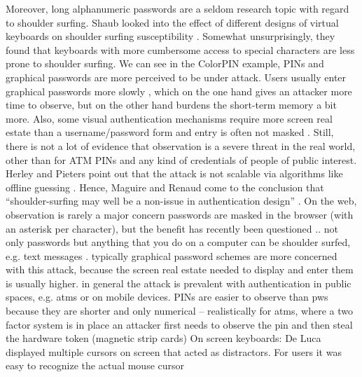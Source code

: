 Moreover, long alphanumeric passwords are a seldom research topic with regard to shoulder surfing. Shaub \etal looked into the effect of different designs of virtual keyboards on shoulder surfing susceptibility \cite{Schaub2012PasswordShoulderSurfing}. Somewhat unsurprisingly, they found that keyboards with more cumbersome access to special characters are less prone to shoulder surfing. We can see in the ColorPIN example, PINs and graphical passwords are more perceived to be under attack. Users usually enter graphical passwords more slowly \cite{Tari2006ShoulderSurfingComparison, Wiedenbeck2006ConvexHull, Renaud2009VisualSnakeOil}, which on the one hand gives an attacker more time to observe, but on the other hand burdens the short-term memory a bit more. Also, some visual authentication mechanisms require more screen real estate than a username/password form and entry is often not masked \cite{Biddle2009GraphicalFirstTwelveYears}. Still, there is not a lot of evidence that observation is a severe threat in the real world, other than for ATM PINs and any kind of credentials of people of public interest. Herley and Pieters point out that the attack is not scalable via algorithms like offline guessing \cite{Herley2015Counterfactuals}. Hence, Maguire and Renaud come to the conclusion that ``shoulder-surfing may well be a non-issue in authentication design'' \cite{Maguire2012YouOnlyLiveTwice}. 
 On the web, observation is rarely a major concern passwords are masked in the browser (with an asterisk per character), but the benefit has recently been questioned \cite{Sasse2016DebunkingMyths}.. not only passwords but anything that you do on a computer can be shoulder surfed, e.g. text messages \cite{Eiband2016MyScrawl}. typically graphical password schemes are more concerned with this attack, because the screen real estate needed to display and enter them is usually higher.  \cite{Tari2006ShoulderSurfingComparison} in general the attack is prevalent with authentication in public spaces, e.g. atms or on mobile devices. \cite{DeLuca2013BackOfDevice} \cite{Roth2004PINShoulderSurfing} PINs are easier to observe than pws because they are shorter and only numerical -- realistically for atms, where a two factor system is in place an attacker first needs to observe the pin and then steal the hardware token (magnetic strip cards) On screen keyboards: De Luca \etal displayed multiple cursors on screen that acted as distractors. For users it was easy to recognize the actual mouse cursor 
\cite{DeLuca2013FakeCursors}  



